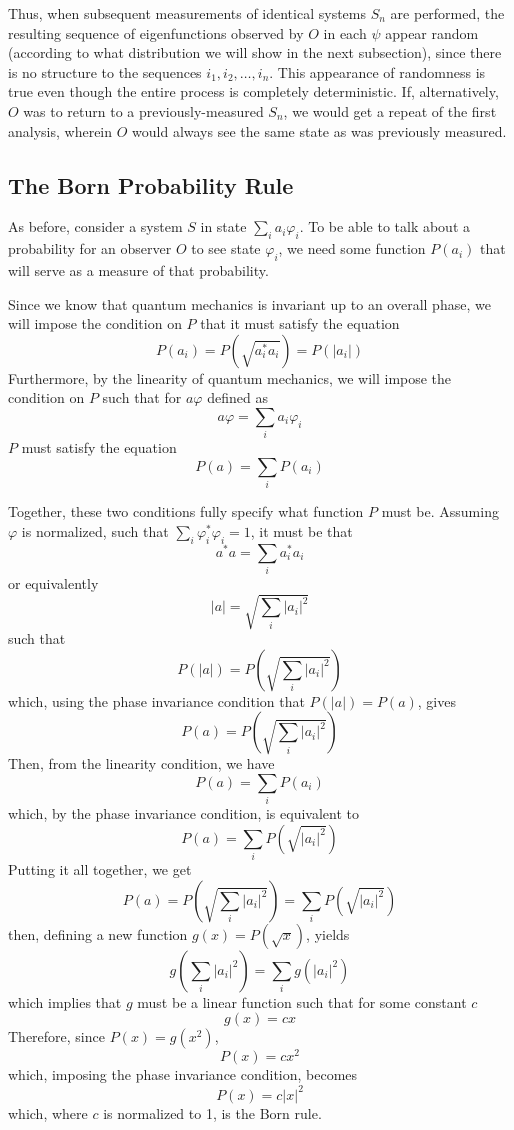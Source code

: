 \documentclass[
    12pt,
    letterpaper,
    aps,
    prd,
    longbibliography,
    twocolumn,
    nofootinbib,
    raggedbottom,
    amsmath,
    amssymb,
    amsfonts,
]{revtex4-1}
\newcommand{\pn}[1]{\left(#1\right)}
\newcommand{\abs}[1]{\left|#1\right|}
\renewcommand{\phi}{\varphi}
\begin{document}
Thus, when subsequent measurements of identical systems $S_n$ are performed, the resulting sequence of eigenfunctions observed by $O$ in each $\psi$ appear random (according to what distribution we will show in the next subsection), since there is no structure to the sequences $i_1, i_2, \ldots, i_n$. This appearance of randomness is true even though the entire process is completely deterministic. If, alternatively, $O$ was to return to a previously-measured $S_n$, we would get a repeat of the first analysis, wherein $O$ would always see the same state as was previously measured.

\subsection{The Born Probability Rule}
\label{sec:born}

As before, consider a system $S$ in state $\sum_i a_i \phi_i$. To be able to talk about a probability for an observer $O$ to see state $\phi_i$, we need some function $P(a_i)$ that will serve as a measure of that probability.

Since we know that quantum mechanics is invariant up to an overall phase, we will impose the condition on $P$ that it must satisfy the equation
\[
    P(a_i) = P\pn{\sqrt{a_i^* a_i}} = P(\abs{a_i})
\]
Furthermore, by the linearity of quantum mechanics, we will impose the condition on $P$ such that for $a \phi$ defined as
\[
    a \phi = \sum_i a_i \phi_i
\]
$P$ must satisfy the equation
\[
    P(a) = \sum_i P(a_i)
\]

Together, these two conditions fully specify what function $P$ must be. Assuming $\phi$ is normalized, such that $\sum_i \phi_i^* \phi_i = 1$, it must be that
\[
    a^* a = \sum_i a_i^* a_i
\]
or equivalently
\[
    \abs{a} = \sqrt{\sum_i \abs{a_i}^2}
\]
such that
\[
    P(\abs{a}) = P\pn{\sqrt{\sum_i \abs{a_i}^2}}
\]
which, using the phase invariance condition that $P(\abs{a}) = P(a)$, gives
\[
    P(a) = P\pn{\sqrt{\sum_i \abs{a_i}^2}}
\]
Then, from the linearity condition, we have
\[
    P(a) = \sum_i P(a_i)
\]
which, by the phase invariance condition, is equivalent to
\[
    P(a) = \sum_i P\pn{\sqrt{\abs{a_i}^2}}
\]
Putting it all together, we get
\[
    P(a) = P\pn{\sqrt{\sum_i \abs{a_i}^2}} = \sum_i P\pn{\sqrt{\abs{a_i}^2}}
\]
then, defining a new function $g(x) = P(\sqrt{x})$, yields
\[
    g\pn{\sum_i \abs{a_i}^2} = \sum_i g\pn{\abs{a_i}^2}
\]
which implies that $g$ must be a linear function such that for some constant $c$
\[
    g(x) = c x
\]
Therefore, since $P(x) = g(x^2)$,
\[
    P(x) = c x^2
\]
which, imposing the phase invariance condition, becomes
\[
    P(x) = c \abs{x}^2
\]
which, where $c$ is normalized to 1, is the Born rule.
\end{document}
